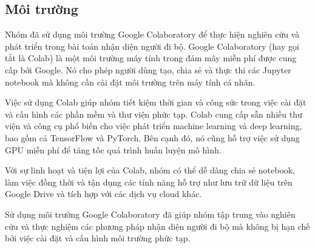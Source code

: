 \subsection{Môi trường}
Nhóm đã sử dụng môi trường Google Colaboratory để thực hiện nghiên cứu và phát triển trong bài toán nhận diện người đi bộ. Google Colaboratory (hay gọi tắt là Colab) là một môi trường máy tính trong đám mây miễn phí được cung cấp bởi Google. Nó cho phép người dùng tạo, chia sẻ và thực thi các Jupyter notebook mà không cần cài đặt môi trường trên máy tính cá nhân.

Việc sử dụng Colab giúp nhóm tiết kiệm thời gian và công sức trong việc cài đặt và cấu hình các phần mềm và thư viện phức tạp. Colab cung cấp sẵn nhiều thư viện và công cụ phổ biến cho việc phát triển machine learning và deep learning, bao gồm cả TensorFlow và PyTorch. Bên cạnh đó, nó cũng hỗ trợ việc sử dụng GPU miễn phí để tăng tốc quá trình huấn luyện mô hình.

Với sự linh hoạt và tiện lợi của Colab, nhóm có thể dễ dàng chia sẻ notebook, làm việc đồng thời và tận dụng các tính năng hỗ trợ như lưu trữ dữ liệu trên Google Drive và tích hợp với các dịch vụ cloud khác.

Sử dụng môi trường Google Colaboratory đã giúp nhóm tập trung vào nghiên cứu và thực nghiệm các phương pháp nhận diện người đi bộ mà không bị hạn chế bởi việc cài đặt và cấu hình môi trường phức tạp.